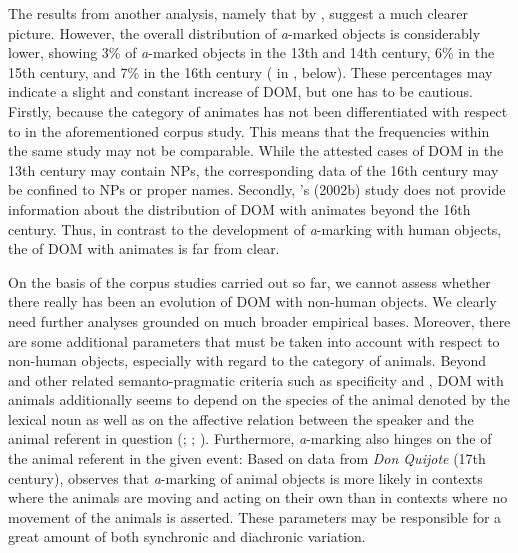 \documentclass[output=paper]{LSP/langsci}
\begin{document}
The results from another  analysis, namely that by \citet{Company2002Avance,Company2002Grammaticalization}, suggest a much clearer picture. However, the overall distribution of \textit{a}-marked  objects is considerably lower, showing 3\% of \textit{a}-marked  objects in the 13th and 14th century, 6\% in the 15th century, and 7\% in the 16th century (\cf {} in , below). These percentages may indicate a slight and constant increase of DOM, but one has to be cautious. Firstly, because the category of animates has not been differentiated with respect to  in the aforementioned corpus study. This means that the frequencies within the same study may not be comparable. While the attested cases of DOM in the 13th century may contain   NPs, the corresponding data of the 16th century may be confined to   NPs or proper names. 
Secondly, \citeauthor{Company2002Grammaticalization}'s (2002b) 
study does not provide information about the distribution of DOM with animates beyond the 16th century. Thus, in contrast to the development of \textit{a}-marking with human objects, the  of DOM with animates is far from clear. 

On the basis of the corpus studies carried out so far, we cannot assess whether there really has been an evolution of DOM with  non-human objects. We clearly need further analyses grounded on much broader empirical bases. Moreover, there are some additional parameters that must be taken into account with respect to  non-human objects, especially with regard to the category of animals. Beyond  and other related semanto-pragmatic criteria such as specificity and , DOM with animals additionally seems to depend on the species of the animal denoted by the lexical noun as well as on the affective relation between the speaker and the animal referent in question (\cf \citealt[159]{Bossong1991Differential}; \citealt[457]{Aissen2003Differential}; \citealt[2635]{RealAcademia2010Espanola}). Furthermore, \textit{a}-marking also hinges on the  of the animal referent in the given event: Based on data from \textit{Don Quijote} (17th century), \citet[42]{Garcia1993Syntactic} observes that \textit{a}-marking of  animal objects is more likely in contexts where the animals are moving and acting on their own than in contexts where no movement of the animals is asserted. These parameters may be responsible for a great amount of both synchronic and diachronic variation.
\end{document}
